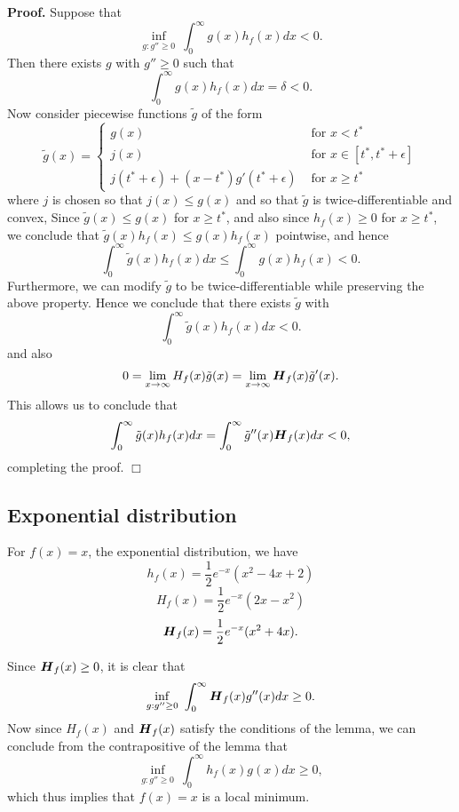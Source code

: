 \documentclass[11pt]{article}
\begin{document}
\noindent \textbf{Proof.}  
Suppose that
\[
\inf_{g: g'' \geq 0}\ \int_0^\infty g(x) h_f(x) dx < 0.
\]
Then there exists $g$ with $g'' \geq 0$ such that
\[
\int_0^\infty g(x) h_f(x) dx  = \delta < 0.
\]
Now consider piecewise functions $\tilde{g}$ of the form
\[
\tilde{g}(x) = \begin{cases}
g(x) &\text{ for } x < t^*\\
j(x) &\text{ for } x \in [t^*, t^* + \epsilon]\\
j(t^* + \epsilon) + (x-t^*)g'(t^* + \epsilon) &\text{ for }x \geq t^*
\end{cases}
\]
where $j$ is chosen so that $j(x) \leq g(x)$ and so that $\tilde{g}$ is twice-differentiable and convex,
Since $\tilde{g}(x) \leq g(x)$ for $x \geq t^*$,
and also since $h_f(x) \geq 0$ for $x \geq t^*$,
we conclude that $\tilde{g}(x) h_f(x) \leq g(x) h_f(x)$ pointwise,
and hence
\[
\int_0^\infty \tilde{g}(x) h_f(x) dx \leq \int_0^\infty g(x) h_f(x) < 0.
\]
Furthermore, we can modify $\tilde{g}$ to be twice-differentiable while preserving the above property.
Hence we conclude that there exists
$\tilde{g}$ with
\[
\int_0^\infty \tilde{g}(x) h_f(x) dx  < 0.
\]
and also
\[
0 = \lim_{x \to \infty} H_f(x) \tilde{g}(x) = \lim_{x \to \infty} \boldsymbol{H}_f(x) \tilde{g}'(x).
\]
This allows us to conclude that
\[
\int_0^\infty \tilde{g}(x) h_f(x) dx = \int_0^\infty \tilde{g}''(x) \boldsymbol{H}_f(x) dx < 0,
\]
completing the proof. $\Box$

\subsection{Exponential distribution}

For $f(x) = x$, the exponential distribution, we have
\[
h_f(x) = \frac{1}{2}e^{-x}(x^2 - 4x + 2)
\]
\[
H_f(x) = \frac{1}{2}e^{-x}(2x-x^2)
\]
\[
\boldsymbol{H}_f(x) = \frac{1}{2}e^{-x}(x^2 + 4x).
\]

Since $\boldsymbol{H}_f(x) \geq 0$, it is clear that
\[
\inf_{g: g'' \geq 0}\ \int_0^\infty \boldsymbol{H}_f(x) g''(x) dx \geq 0.
\]
Now since $H_f(x)$ and $\boldsymbol{H}_f(x)$ satisfy the conditions of the lemma, we can conclude from the contrapositive of the lemma that
\[
\inf_{g: g'' \geq 0}\ \int_0^\infty h_f(x) g(x) dx \geq 0,
\]
which thus implies that $f(x) = x$ is a local minimum.
\end{document}
